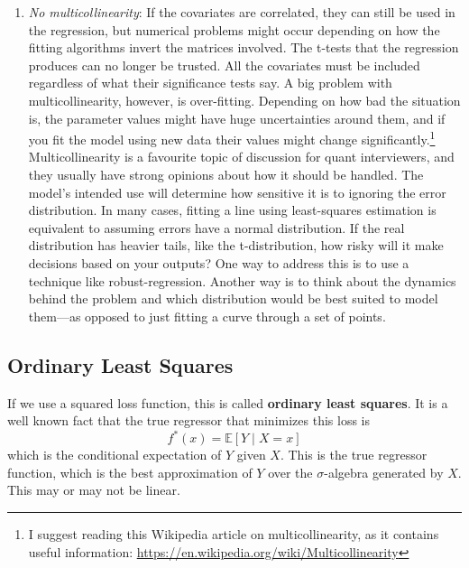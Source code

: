 \documentclass{article}
\begin{document}
\begin{enumerate}
      \item \textit{No multicollinearity}: If the covariates are correlated, they can still be used in the regression, but numerical problems might occur depending on how the fitting algorithms invert the matrices involved. The t-tests that the regression produces can no longer be trusted. All the covariates must be included regardless of what their significance tests say.
      A big problem with multicollinearity, however, is over-fitting.
      Depending on how bad the situation is, the parameter values might have huge uncertainties around them, and if you fit the model using new data their values might change significantly.\footnote{I suggest reading this Wikipedia article on multicollinearity, as it contains useful information: \url{https://en.wikipedia.org/wiki/Multicollinearity}} Multicollinearity is a favourite topic of discussion for quant interviewers, and they usually have strong opinions about how it should be handled. The model's intended use will determine how sensitive it is to ignoring the error distribution. In many cases, fitting a line using least-squares estimation is equivalent to assuming errors have a normal distribution. If the real distribution has heavier tails, like the t-distribution, how risky will it make decisions based on your outputs? One way to address this is to use a technique like robust-regression. Another way is to think about the dynamics behind the problem and which distribution would be best suited to model them---as opposed to just fitting a curve through a set of points.
    \end{enumerate}

  \subsection{Ordinary Least Squares}

    If we use a squared loss function, this is called \textbf{ordinary least squares}. It is a well known fact that the true regressor that minimizes this loss is 
    \begin{equation}
      f^\ast (x) = \mathbb{E}[Y \mid X = x]
    \end{equation}
    which is the conditional expectation of $Y$ given $X$. This is the true regressor function, which is the best approximation of $Y$ over the $\sigma$-algebra generated by $X$. This may or may not be linear. 
\end{document}
